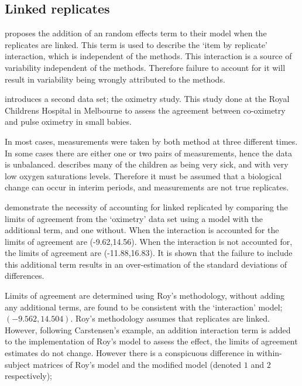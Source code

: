 \documentclass[12pt, a4paper]{report}
\theoremstyle{plain}
\theoremstyle{definition}
\theoremstyle{remark}
\begin{document}
	\subsection{Linked replicates}
	
	\citet{BXC2008} proposes the addition of an random effects term to their model when the replicates are linked. This term is used to describe the `item by replicate' interaction, which is independent of the methods. This interaction is a source of variability independent of the methods. Therefore failure to account for it will result in variability being wrongly attributed to the methods.
	
	\citet{BXC2008} introduces a second data set; the oximetry study. This study done at the Royal Childrens Hospital in
	Melbourne to assess the agreement between co-oximetry and pulse oximetry in small babies.
	
	In most cases, measurements were taken by both method at three different times. In some cases there are either one or two pairs of measurements, hence the data is unbalanced. \citet{BXC2008} describes many of the children as being very sick, and with very low oxygen saturations levels. Therefore it must be assumed that a biological change can occur in interim periods, and measurements are not true replicates.
	
	\citet{BXC2008} demonstrate the necessity of accounting for linked replicated by comparing the limits of agreement from the `oximetry' data set using a model with the additional term, and one without. When the interaction is accounted for the limits of agreement are (-9.62,14.56). When the interaction is not accounted for, the limits of agreement are (-11.88,16.83). It is shown that the failure to include this additional term results in an over-estimation of the standard deviations of differences.
	
	Limits of agreement are determined using Roy's methodology, without adding any additional terms, are found to be consistent with the `interaction' model; $(-9.562, 14.504 )$. Roy's methodology assumes that replicates are linked. However, following Carstensen's example, an addition interaction term is added to the implementation of Roy's model to assess the effect, the limits of agreement estimates do not change. However there is a conspicuous difference in within-subject matrices of Roy's model and the modified model (denoted $1$ and $2$ respectively);
	
\end{document}
